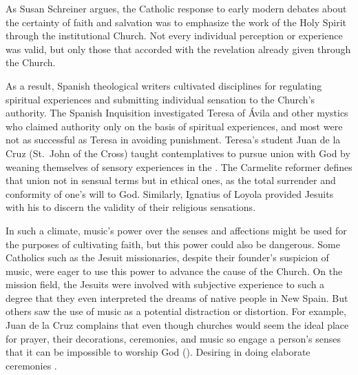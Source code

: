 As Susan Schreiner argues, the Catholic response to early modern debates about 
the certainty of faith and salvation was to emphasize the work of the Holy 
Spirit through the institutional Church.%
    \Autocite[131--208]{Schreiner:Certainty}
Not every individual perception or experience was valid, but only those that 
accorded with the revelation already given through the Church.

As a result, Spanish theological writers cultivated disciplines for regulating 
spiritual experiences and submitting individual sensation to the Church's 
authority.
The Spanish Inquisition investigated Teresa of Ávila and other mystics who 
claimed authority only on the basis of spiritual experiences, and most were not 
as successful as Teresa in avoiding punishment.
    \Autocites{Ahlgren:TeresaPolitics}{Francisca:Inquisition}
Teresa's student Juan de la Cruz (St.\ John of the Cross) taught contemplatives 
to pursue union with God by weaning themselves of sensory experiences in the 
.
The Carmelite reformer defines that union not in sensual terms but in ethical 
ones, as the total surrender and conformity of one's will to God.%
    \Autocite[bk.~I, ch.~5--7, 226--248]{JuandelaCruz:Subida}
Similarly, Ignatius of Loyola provided Jesuits with his  to discern the validity of their religious sensations.%
    \Autocite[ch.~6]{Schreiner:Certainty}

In such a climate, music's power over the senses and affections might be used 
for the purposes of cultivating faith, but this power could also be dangerous.
Some Catholics such as the Jesuit missionaries, despite their founder's 
suspicion of music, were eager to use this power to advance the cause of the 
Church.
On the mission field, the Jesuits were involved with subjective experience to 
such a degree that they even interpreted the dreams of native people in New 
Spain.%
    \Autocite[40--41]{Bailey:Art}
But others saw the use of music as a potential distraction or distortion.
For example, Juan de la Cruz complains that even though churches would seem the 
ideal place for prayer, their decorations, ceremonies, and music so engage a 
person's senses that it can be impossible to worship God  ().%
    \Autocite[bk.~3, ch.~39--45, 415--424]{JuandelaCruz:Subida}
Desiring  in doing elaborate ceremonies 
.%
    \Autocite[bk.~3, ch.~43, 420:
    ]
    {JuandelaCruz:Subida}

